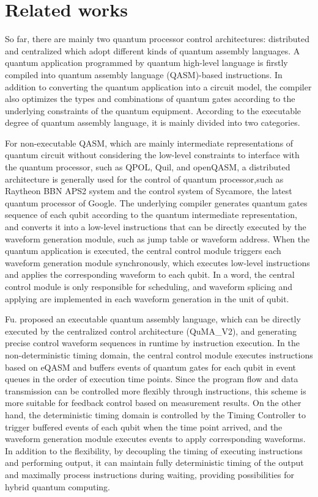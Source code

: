 \section{Related works}
So far, there are mainly two quantum processor control architectures: distributed and centralized which adopt different kinds of quantum assembly languages.
A quantum application programmed by quantum high-level language is firstly compiled into quantum assembly language (QASM)-based instructions. 
In addition to converting the quantum application into a circuit model, the compiler also optimizes the types and combinations of quantum gates according to the underlying constraints of the quantum equipment. 
According to the executable degree of quantum assembly language, it is mainly divided into two categories. 

For non-executable QASM, which are mainly intermediate representations of quantum circuit without considering the low-level constraints to interface with the quantum processor, such as QPOL, Quil, and openQASM, 
a distributed architecture is generally used for the control of quantum processor,such as Raytheon BBN APS2 system and the control system of Sycamore, the latest quantum processor of Google. The underlying compiler generates quantum gates sequence of each qubit according to the quantum intermediate representation, 
and converts it into a low-level instructions that can be directly executed by the waveform generation module, such as jump table or waveform address. When the quantum application is executed, 
the central control module triggers each waveform generation module synchronously, which executes low-level instructions and applies the corresponding waveform to each qubit. 
In a word, the central control module is only responsible for scheduling, and waveform splicing and applying are implemented in each waveform generation in the unit of qubit.

Fu. proposed an executable quantum assembly language, which can be directly executed by the centralized control architecture (QuMA\_V2), 
and generating precise control waveform sequences in runtime by instruction execution. 
In the non-deterministic timing domain, the central control module executes instructions based on eQASM and buffers events of quantum gates for each qubit in event queues in the order of execution time points. 
Since the program flow and data transmission can be controlled more flexibly through instructions, this scheme is more suitable for feedback control based on measurement results. On the other hand, 
the deterministic timing domain is controlled by the Timing Controller to trigger buffered events of each qubit when the time point arrived, and the waveform generation module executes events to apply corresponding waveforms. 
In addition to the flexibility, by decoupling the timing of executing instructions and performing output, 
it can maintain fully deterministic timing of the output and maximally process instructions during waiting, providing possibilities for hybrid quantum computing.